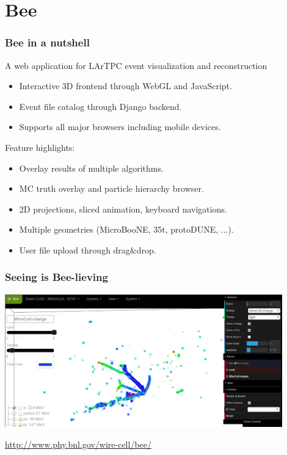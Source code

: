 \documentclass[xcolor=dvipsnames]{beamer}
\begin{document}



\section{Bee}

\begin{frame}
  \frametitle{Bee in a nutshell}

  A web application for LArTPC event visualization and reconstruction
  \begin{itemize}
  \item Interactive 3D frontend through WebGL and JavaScript.
  \item Event file catalog through Django backend.
  \item Supports all major browsers including mobile devices.
  \end{itemize}

  \vspace{3mm}

  Feature highlights:
  \begin{itemize}
  \item Overlay results of multiple algorithms.
  \item MC truth overlay and particle hierarchy browser.
  \item 2D projections, sliced animation, keyboard navigations.
  \item Multiple geometries (MicroBooNE, 35t, protoDUNE, ...).
  \item User file upload through drag\&drop.
  \end{itemize}
\end{frame}

\begin{frame}
  \frametitle{Seeing is Bee-lieving}
  
    \begin{center}
      \includegraphics[width=0.9\textwidth]{bee.png}

      \vspace{5mm}

      \url{http://www.phy.bnl.gov/wire-cell/bee/}
    \end{center}

\end{frame}
\end{document}
